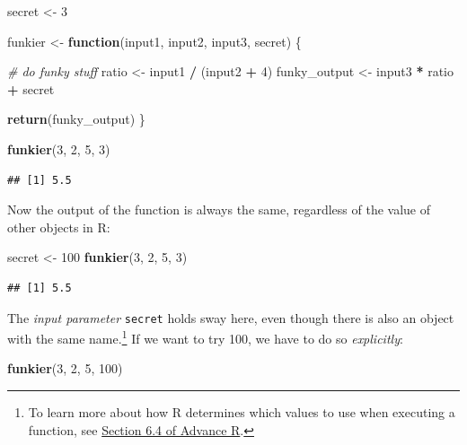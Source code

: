 \documentclass[
]{book}
\newenvironment{Shaded}{\begin{snugshade}}{\end{snugshade}}
\newcommand{\CommentTok}[1]{\textcolor[rgb]{0.56,0.35,0.01}{\textit{#1}}}
\newcommand{\ControlFlowTok}[1]{\textcolor[rgb]{0.13,0.29,0.53}{\textbf{#1}}}
\newcommand{\DecValTok}[1]{\textcolor[rgb]{0.00,0.00,0.81}{#1}}
\newcommand{\FunctionTok}[1]{\textcolor[rgb]{0.13,0.29,0.53}{\textbf{#1}}}
\newcommand{\NormalTok}[1]{#1}
\newcommand{\OtherTok}[1]{\textcolor[rgb]{0.56,0.35,0.01}{#1}}
\newcommand{\SpecialCharTok}[1]{\textcolor[rgb]{0.81,0.36,0.00}{\textbf{#1}}}
\begin{document}
\begin{Shaded}
\begin{Highlighting}[]
\NormalTok{secret }\OtherTok{\textless{}{-}} \DecValTok{3}

\NormalTok{funkier }\OtherTok{\textless{}{-}} \ControlFlowTok{function}\NormalTok{(input1, input2, input3, secret) \{}
  
  \CommentTok{\# do funky stuff}
\NormalTok{  ratio }\OtherTok{\textless{}{-}}\NormalTok{ input1 }\SpecialCharTok{/}\NormalTok{ (input2 }\SpecialCharTok{+} \DecValTok{4}\NormalTok{)}
\NormalTok{  funky\_output }\OtherTok{\textless{}{-}}\NormalTok{ input3 }\SpecialCharTok{*}\NormalTok{ ratio }\SpecialCharTok{+}\NormalTok{ secret}
  
  \FunctionTok{return}\NormalTok{(funky\_output)  }
\NormalTok{\}}

\FunctionTok{funkier}\NormalTok{(}\DecValTok{3}\NormalTok{, }\DecValTok{2}\NormalTok{, }\DecValTok{5}\NormalTok{, }\DecValTok{3}\NormalTok{)}
\end{Highlighting}
\end{Shaded}

\begin{verbatim}
## [1] 5.5
\end{verbatim}

Now the output of the function is always the same, regardless of the value of other objects in R:

\begin{Shaded}
\begin{Highlighting}[]
\NormalTok{secret }\OtherTok{\textless{}{-}} \DecValTok{100}
\FunctionTok{funkier}\NormalTok{(}\DecValTok{3}\NormalTok{, }\DecValTok{2}\NormalTok{, }\DecValTok{5}\NormalTok{, }\DecValTok{3}\NormalTok{)}
\end{Highlighting}
\end{Shaded}

\begin{verbatim}
## [1] 5.5
\end{verbatim}

The \emph{input parameter} \texttt{secret} holds sway here, even though there is also an object with the same name.\footnote{To learn more about how R determines which values to use when executing a function, see \href{https://adv-r.hadley.nz/functions.html\#lexical-scoping}{Section 6.4 of Advance R}.} If we want to try 100, we have to do so \emph{explicitly}:

\begin{Shaded}
\begin{Highlighting}[]
\FunctionTok{funkier}\NormalTok{(}\DecValTok{3}\NormalTok{, }\DecValTok{2}\NormalTok{, }\DecValTok{5}\NormalTok{, }\DecValTok{100}\NormalTok{)}
\end{Highlighting}
\end{Shaded}
\end{document}
